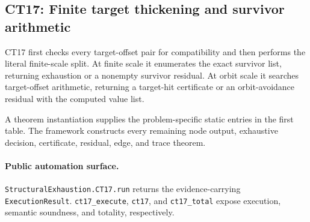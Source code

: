 \subsection{CT17: Finite target thickening and survivor arithmetic}
\label{sec:ct17-automation}

CT17 first checks every target-offset pair for compatibility and then performs the literal finite-scale split. At finite scale it enumerates the exact survivor list, returning exhaustion or a nonempty survivor residual. At orbit scale it searches target-offset arithmetic, returning a target-hit certificate or an orbit-avoidance residual with the computed value list.

A theorem instantiation supplies the problem-specific static entries in the first table. The framework constructs every remaining node output, exhaustive decision, certificate, residual, edge, and trace theorem.

\paragraph{Public automation surface.}
\texttt{StructuralExhaustion.CT17.run} returns the evidence-carrying \texttt{ExecutionResult}. \texttt{ct17\_\allowbreak{}execute}, \texttt{ct17}, and \texttt{ct17\_\allowbreak{}total} expose execution, semantic soundness, and totality, respectively.

